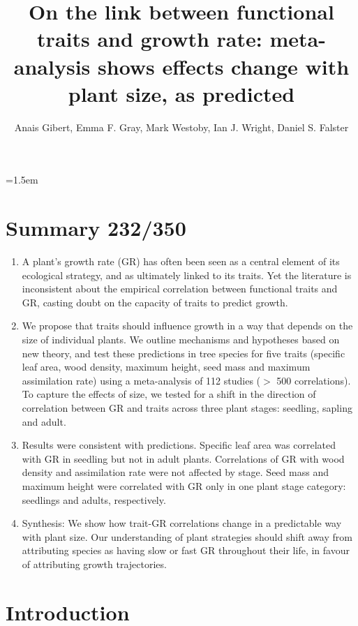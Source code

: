 \documentclass[a4paper,11pt]{article}
\title{On the link between functional traits and growth rate: meta-analysis shows effects change with plant size, as predicted}
\author{Anais Gibert\textasteriskcentered, Emma F. Gray, Mark Westoby, Ian J. Wright, Daniel S. Falster}
\affiliation{Biological Sciences, Macquarie University NSW 2109, Australia\\
\textasteriskcentered Email for correspondence: \texttt{anais.gibert@gmail.com}\\
Word count: ~5538 words (without supplementary material, Fig and ref)}
\date{}
\begin{document}
\mstitlepage
\noindent
\parindent=1.5em
\addtolength{\parskip}{.3em}
\doublespacing
\linenumbers
\section{Summary 232/350}\label{abstract}
\begin{enumerate}
\def\labelenumi{\arabic{enumi}.}
\itemsep1pt\parskip0pt
\item A plant's growth rate (GR) has often been seen as a central element of its ecological strategy, and as ultimately linked to its traits. Yet the literature is inconsistent about the empirical correlation between functional traits and GR, casting doubt on the capacity of traits to predict growth.

\item We propose that traits should influence growth in a way that depends on the size of individual plants. We outline mechanisms and hypotheses based on new theory, and test these predictions in tree species for five traits (specific leaf area, wood density, maximum height, seed mass and maximum assimilation rate) using a meta-analysis of 112 studies ($>$ 500 correlations). To capture the effects of size, we tested for a shift in the direction of correlation between GR and traits across three plant stages: seedling, sapling and adult.

\item Results were consistent with predictions. Specific leaf area was correlated with GR in seedling but not in adult plants. Correlations of GR with wood density and assimilation rate were not affected by stage. Seed mass and maximum height were correlated with GR only in one plant stage category: seedlings and adults, respectively.

\item Synthesis: We show how trait-GR correlations change in a predictable way with plant size. Our understanding of plant strategies should shift away from attributing species as having slow or fast GR throughout their life, in favour of attributing growth trajectories.

\end{enumerate}

\clearpage

\section*{Introduction}\label{introduction}
\end{document}
